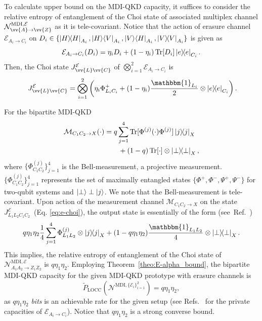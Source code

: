 \documentclass[aps,pra,twocolumn,superscriptaddress,longbibliography]{revtex4-1}
\def\Tr{\operatorname{Tr}}
\def\LOCC{\operatorname{LOCC}}
\newcommand{\mc}[1]{\mathcal{#1}}
\newcommand{\wt}[1]{\widetilde{#1}}
\begin{document}
To calculate upper bound on the MDI-QKD capacity, it suffices to consider the relative entropy of entanglement of the Choi state of associated multiplex channel $\mathcal{N}^{\text{MDI},\mathcal{E}}_{\vv{A}\to \vv{Z}}$ as it is tele-covariant. Notice that the action of erasure channel $\mathcal{E}_{A_i\to C_i}$ on $D_i\in\{\op{H}_{A_i},\ket{H}\!\bra{V}_{A_i},\ket{V}\!\bra{H}_{A_i},\op{V}_{A_i}\}$ is given as
\begin{equation}
\mathcal{E}_{A_i\to C_i}(D_i)=\eta_iD_i+(1-\eta_i) \Tr[D_i]\op{e}_{C_i}.
\end{equation}
Then, the Choi state $J^\mathcal{E}_{\vv{L}\vv{C}}$ of $\bigotimes_{i=1}^2\mathcal{E}_{A_i\to C_i}$ is
\begin{equation}~\label{eq:e-choi}
   J^\mathcal{E}_{\vv{L}\vv{C}}=\bigotimes_{i=1}^2 \left(\eta_i\Phi^+_{L_iC_i}+ (1-\eta_i)\frac{\mathbbm{1}_{L_i}}{2}\otimes\op{e}_{C_i}\right). 
\end{equation}

For the bipartite MDI-QKD 
\begin{align}
    \mathcal{M}_{C_1C_2\to X}(\cdot) & =   q\sum_{j=1}^4\Tr[\Phi^{(j)}(\cdot)\Phi^{(j)}] \op{j}_X \nonumber \\ 
    &\qquad +(1-q)\Tr[\cdot]\otimes\op{\perp}_X, \label{eq:bell-m}
\end{align}
where $\{\Phi^{(j)}_{C_1C_2}\}_{j=1}^4$ is the Bell-measurement, a projective measurement. $\{\Phi^{(j)}_{C_1C_2}\}_{j=1}^4$ represents the set of maximally entangled states $\{\Phi^+,\Phi^-,\Psi^+,\Psi^-\}$ for two-qubit systems and $\ket{\perp}\perp\ket{j}$. We note that the Bell-measurement is tele-covariant. Upon action of the measurement channel $\mc{M}_{C_1C_2\to X}$ on the state $J^{\mathcal{E}}_{L_1L_2C_1C_2}$~(Eq. \eqref{eq:e-choi}), the output state is essentially of the form (see~Ref.~\cite{DKD18}) 
\begin{equation}
q\eta_1\eta_2\frac{1}{4} \sum_{j=1}^4 \Phi^{(j)}_{L_1L_2}\otimes\op{j}_X+(1-q\eta_1\eta_2)\frac{\mathbbm{1}_{L_1L_2}}{4}\otimes\op{\perp}_X. 
\end{equation}
This implies, the relative entropy of entanglement of the Choi state of $\mathcal{N}^{\text{MDI},\mathcal{E}}_{A_1A_2\to Z_1Z_2}$ is $q\eta_1\eta_2$. Employing Theorem~\ref{theo:E-alpha_bound}, the bipartite MDI-QKD capacity for the given MDI-QKD prototype with erasure channels is  
\begin{equation}\label{eq:dbwhh}
    \wt{P}_{\LOCC}(\mathcal{N}^{\text{MDI},\{\mathcal{E}_i\}_{i=1}^2})=q\eta_1\eta_2,
\end{equation}
as $q\eta_1\eta_2$ \textit{bits} is an achievable rate for the given setup  (see Refs.~\cite{GES16,PLOB15,WTB16} for the private capacities of $\mathcal{E}_{A_i\to C_i}$). Notice that $q\eta_1\eta_2$ is a strong converse bound.
\end{document}
